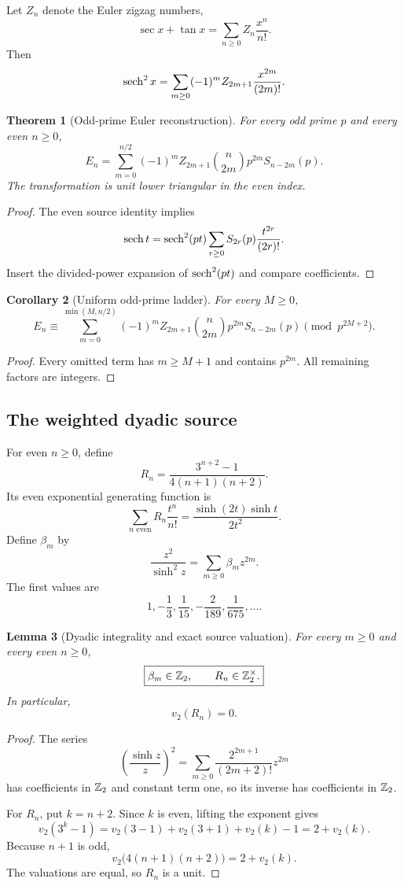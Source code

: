 \documentclass[11pt]{article}
\newtheorem{theorem}{Theorem}[section]\newtheorem{proposition}[theorem]{Proposition}\newtheorem{lemma}[theorem]{Lemma}\newtheorem{corollary}[theorem]{Corollary}
\theoremstyle{definition}\newtheorem{definition}[theorem]{Definition}\newtheorem{example}[theorem]{Example}\newtheorem{construction}[theorem]{Construction}\newtheorem{algorithm}[theorem]{Algorithm}\newtheorem{conjecture}[theorem]{Conjecture}\newtheorem{problem}[theorem]{Problem}
\theoremstyle{remark}\newtheorem{remark}[theorem]{Remark}\newtheorem{boundary}[theorem]{Boundary}\newtheorem{certificate}[theorem]{Computational Certificate}\newtheorem{classical}[theorem]{Classical Input}\newtheorem{principle}[theorem]{Structural Principle}
\begin{document}
Let $Z_n$ denote the Euler zigzag numbers,
\[
 \sec x+\tan x=\sum_{n\geq0}Z_n\frac{x^n}{n!}.
\]
Then
\[
 \operatorname{sech}^2x=\sum_{m\geq0}(-1)^mZ_{2m+1}\frac{x^{2m}}{(2m)!}.
\]

\begin{theorem}[Odd-prime Euler reconstruction]
For every odd prime $p$ and every even $n\geq0$,
\[
 \boxed{E_n=\sum_{m=0}^{n/2}(-1)^mZ_{2m+1}\binom n{2m}p^{2m}S_{n-2m}(p).}
\]
The transformation is unit lower triangular in the even index.
\end{theorem}

\begin{proof}
The even source identity implies
\[
 \operatorname{sech} t=\operatorname{sech}^2(pt)\sum_{r\geq0}S_{2r}(p)\frac{t^{2r}}{(2r)!}.
\]
Insert the divided-power expansion of $\operatorname{sech}^2(pt)$ and compare coefficients.
\end{proof}

\begin{corollary}[Uniform odd-prime ladder]
For every $M\geq0$,
\[
 \boxed{E_n\equiv\sum_{m=0}^{\min(M,n/2)}(-1)^mZ_{2m+1}\binom n{2m}p^{2m}S_{n-2m}(p)\pmod{p^{2M+2}}.}
\]
\end{corollary}

\begin{proof}
Every omitted term has $m\geq M+1$ and contains $p^{2m}$. All remaining factors are integers.
\end{proof}

\subsection{The weighted dyadic source}
For even $n\geq0$, define
\[
 \boxed{R_n=\frac{3^{n+2}-1}{4(n+1)(n+2)}.}
\]
Its even exponential generating function is
\[
 \boxed{\sum_{n\text{ even}}R_n\frac{t^n}{n!}=\frac{\sinh(2t)\sinh t}{2t^2}.}
\]
Define $\beta_m$ by
\[
 \boxed{\frac{z^2}{\sinh^2z}=\sum_{m\geq0}\beta_mz^{2m}.}
\]
The first values are
\[
 1,-\frac13,\frac1{15},-\frac2{189},\frac1{675},\ldots.
\]

\begin{lemma}[Dyadic integrality and exact source valuation]
For every $m\geq0$ and every even $n\geq0$,
\[
 \boxed{\beta_m\in\mathbb Z_2,\qquad R_n\in\mathbb Z_2^\times.}
\]
In particular,
\[
 \boxed{v_2(R_n)=0.}
\]
\end{lemma}

\begin{proof}
The series
\[
 \left(\frac{\sinh z}{z}\right)^2
 =\sum_{m\geq0}\frac{2^{2m+1}}{(2m+2)!}z^{2m}
\]
has coefficients in $\mathbb Z_2$ and constant term one, so its inverse has coefficients in $\mathbb Z_2$.

For $R_n$, put $k=n+2$. Since $k$ is even, lifting the exponent gives
\[
 v_2(3^k-1)=v_2(3-1)+v_2(3+1)+v_2(k)-1=2+v_2(k).
\]
Because $n+1$ is odd,
\[
 v_2\bigl(4(n+1)(n+2)\bigr)=2+v_2(k).
\]
The valuations are equal, so $R_n$ is a unit.
\end{proof}
\end{document}
